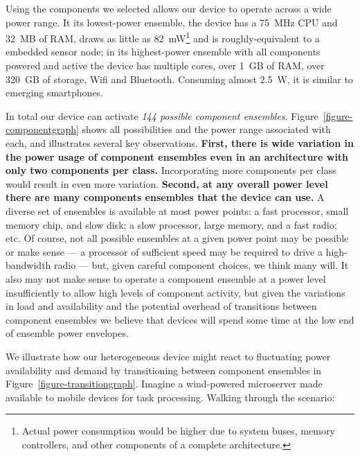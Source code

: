 Using the components we selected allows our device to operate across a wide
power range. It its lowest-power ensemble, the device has a 75~MHz CPU and
32~MB of RAM, draws as little as 82~mW\footnote{Actual power consumption
would be higher due to system buses, memory controllers, and other components
of a complete architecture.} and is roughly-equivalent to a embedded sensor
node; in its highest-power ensemble with all components powered and active
the device has multiple cores, over 1~GB of RAM, over 320~GB of storage, Wifi
and Bluetooth. Consuming almost 2.5~W, it is similar to emerging smartphones.

In total our device can activate \textit{144 possible component ensembles}.
Figure~\ref{figure-componentgraph} shows all possibilities and the power
range associated with each, and illustrates several key observations.
\textbf{First, there is wide variation in the power usage of component
ensembles even in an architecture with only two components per class.}
Incorporating more components per class would result in even more variation.
\textbf{Second, at any overall power level there are many components
ensembles that the device can use.} A diverse set of ensembles is available
at most power points: a fast processor, small memory chip, and slow disk; a
slow processor, large memory, and a fast radio; etc. Of course, not all
possible ensembles at a given power point may be possible or make sense --- a
processor of sufficient speed may be required to drive a high-bandwidth radio
--- but, given careful component choices, we think many will. It also may not
make sense to operate a component ensemble at a power level insufficiently to
allow high levels of component activity, but given the variations in load and
availability and the potential overhead of transitions between component
ensembles we believe that devices will spend some time at the low end of
ensemble power envelopes.

We illustrate how our heterogeneous device might react to fluctuating power
availability and demand by transitioning between component ensembles in
Figure~\ref{figure-transitiongraph}. Imagine a wind-powered microserver made
available to mobile devices for task processing. Walking through the
scenario:





